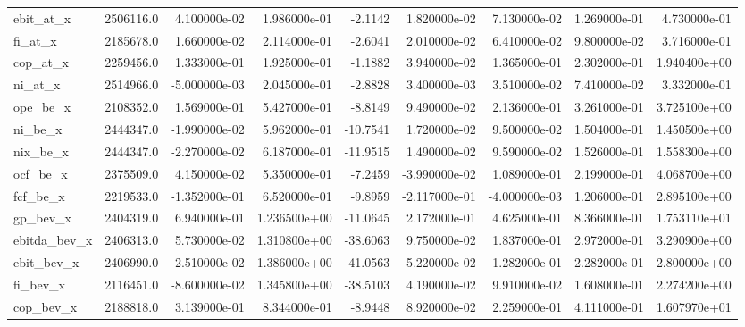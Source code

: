 \documentclass[12pt]{article}
\begin{document}
\begin{landscape}
\begin{longtable}{|l|r|r|r|r|r|r|r|r|}
ebit\_at\_x               &  2506116.0 &  4.100000e-02 &  1.986000e-01 &     -2.1142 &  1.820000e-02 &  7.130000e-02 &  1.269000e-01 &  4.730000e-01 \\
fi\_at\_x                 &  2185678.0 &  1.660000e-02 &  2.114000e-01 &     -2.6041 &  2.010000e-02 &  6.410000e-02 &  9.800000e-02 &  3.716000e-01 \\
cop\_at\_x                &  2259456.0 &  1.333000e-01 &  1.925000e-01 &     -1.1882 &  3.940000e-02 &  1.365000e-01 &  2.302000e-01 &  1.940400e+00 \\
ni\_at\_x                 &  2514966.0 & -5.000000e-03 &  2.045000e-01 &     -2.8828 &  3.400000e-03 &  3.510000e-02 &  7.410000e-02 &  3.332000e-01 \\
ope\_be\_x                &  2108352.0 &  1.569000e-01 &  5.427000e-01 &     -8.8149 &  9.490000e-02 &  2.136000e-01 &  3.261000e-01 &  3.725100e+00 \\
ni\_be\_x                 &  2444347.0 & -1.990000e-02 &  5.962000e-01 &    -10.7541 &  1.720000e-02 &  9.500000e-02 &  1.504000e-01 &  1.450500e+00 \\
nix\_be\_x                &  2444347.0 & -2.270000e-02 &  6.187000e-01 &    -11.9515 &  1.490000e-02 &  9.590000e-02 &  1.526000e-01 &  1.558300e+00 \\
ocf\_be\_x                &  2375509.0 &  4.150000e-02 &  5.350000e-01 &     -7.2459 & -3.990000e-02 &  1.089000e-01 &  2.199000e-01 &  4.068700e+00 \\
fcf\_be\_x                &  2219533.0 & -1.352000e-01 &  6.520000e-01 &     -9.8959 & -2.117000e-01 & -4.000000e-03 &  1.206000e-01 &  2.895100e+00 \\
gp\_bev\_x                &  2404319.0 &  6.940000e-01 &  1.236500e+00 &    -11.0645 &  2.172000e-01 &  4.625000e-01 &  8.366000e-01 &  1.753110e+01 \\
ebitda\_bev\_x            &  2406313.0 &  5.730000e-02 &  1.310800e+00 &    -38.6063 &  9.750000e-02 &  1.837000e-01 &  2.972000e-01 &  3.290900e+00 \\
ebit\_bev\_x              &  2406990.0 & -2.510000e-02 &  1.386000e+00 &    -41.0563 &  5.220000e-02 &  1.282000e-01 &  2.282000e-01 &  2.800000e+00 \\
fi\_bev\_x                &  2116451.0 & -8.600000e-02 &  1.345800e+00 &    -38.5103 &  4.190000e-02 &  9.910000e-02 &  1.608000e-01 &  2.274200e+00 \\
cop\_bev\_x               &  2188818.0 &  3.139000e-01 &  8.344000e-01 &     -8.9448 &  8.920000e-02 &  2.259000e-01 &  4.111000e-01 &  1.607970e+01 \\

\end{longtable}
\end{landscape}
\end{document}
